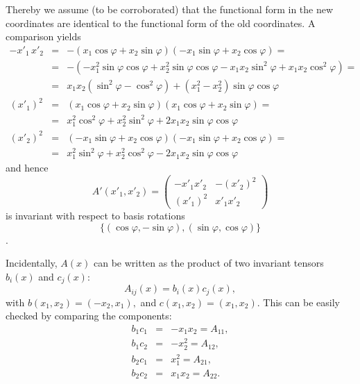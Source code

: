 {Thereby we assume (to be corroborated) that the functional form in the new coordinates are identical
to the functional form of the old coordinates.
A comparison yields
\begin{eqnarray*}
  -x'_1 \,x'_2 & = &
  -\left(x_1 \cos \varphi + x_2 \sin \varphi \right)
  \left(-x_1 \sin \varphi + x_2 \cos \varphi \right) = \\
  & = &
  -\left(
    -x_1^2 \sin \varphi \cos \varphi +
      x_2^2 \sin \varphi \cos \varphi -
      x_1 x_2 \sin^2 \varphi + x_1 x_2 \cos^2 \varphi
  \right) = \\
  & = &
  x_1 x_2 \left(\sin^2 \varphi - \cos^2 \varphi \right) +
    \left(x_1^2 - x_2^2\right) \sin \varphi \cos \varphi \\
  (x'_1)^2  & = &
    \left(x_1 \cos \varphi + x_2 \sin \varphi \right)
    \left(x_1 \cos \varphi + x_2 \sin \varphi \right) = \\
  & = & x_1^2 \cos^2 \varphi + x_2^2 \sin^2 \varphi +
    2 x_1 x_2 \sin \varphi \cos \varphi \\
  (x'_2)^2  & = &
    \left(-x_1 \sin \varphi + x_2 \cos \varphi \right)
    \left(-x_1 \sin \varphi + x_2 \cos \varphi \right) = \\
  & = & x_1^2 \sin^2 \varphi + x_2^2 \cos^2 \varphi -
    2 x_1 x_2 \sin \varphi \cos \varphi
\end{eqnarray*}
and hence
$$A' (x'_1,x'_2)=\left(
    \begin{array}{cc}
      -x'_1x'_2 & -(x'_2)^2 \\
      (x'_1)^2   & x'_1x'_2
    \end{array}
\right)
$$ is invariant with respect to basis rotations $$\{ (\cos \varphi ,-\sin \varphi
),(\sin
\varphi ,\cos \varphi )\}$$.


Incidentally, $A(x)$ can be written as the product of two invariant tensors $b_i(x)$ and $c_j(x)$:
$$A_{ij}(x)=b_i(x)c_j(x),$$
with
$
b(x_1,x_2)=(-x_2,x_1),
$ and
$
c(x_1,x_2)=(x_1,x_2)
$.
This can be easily checked by comparing the components:
\begin{eqnarray*}
b_1c_1&=&-x_1x_2 = A_{11},\\
b_1c_2&=&-x_2^2 = A_{12},\\
b_2c_1&=&x_1^2 = A_{21},\\
b_2c_2&=&x_1x_2 = A_{22}.\\
\end{eqnarray*}

}

